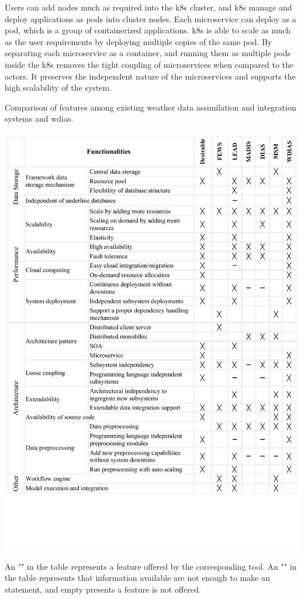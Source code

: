 Users can add nodes much as required into the \acrshort{k8s} cluster, and \acrshort{k8s} manage and deploy applications as pods into cluster nodes. Each microservice can deploy as a pod, which is a group of containerized applications. \acrshort{k8s} is able to scale as much as the user requirements by deploying multiple copies of the same pod. By separating each microservice as a container, and running them as multiple pods inside the \acrshort{k8s} removes the tight coupling of microservices when compared to the actors. It preserves the independent nature of the microservices and supports the high scalability of the system.

\begin{table}[htp]
    \caption{Comparison of features among existing weather data assimilation and integration systems and \acrshort{wdias}. }
    \includegraphics[width=1\textwidth]{method/misc/architecture_comparison_pros_cons.pdf}
    \label{tab:architecture_comparison}
    {\raggedright \footnotesize An "\Cross" in the table represents a feature offered by the corresponding tool. An "\SmallHBar" in the table represents that information available are not enough to make an statement, and empty presents a feature is not offered. \par}
\end{table}

